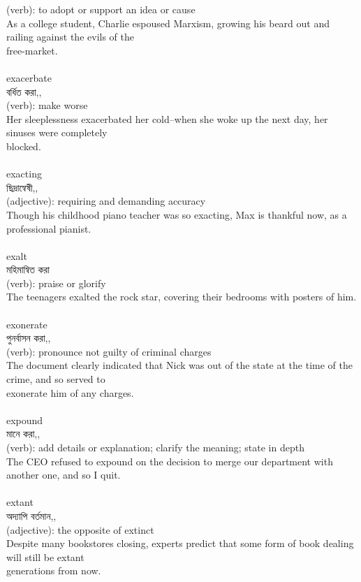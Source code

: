 \documentclass{article}
\begin{document}
{(verb): to adopt or support an idea or cause\\As a college student, Charlie espoused Marxism, growing his beard out and railing against the evils of the\\free-market.\\}\\
{exacerbate}\\
{বর্ধিত করা,,}\\
{(verb): make worse\\Her sleeplessness exacerbated her cold--when she woke up the next day, her sinuses were completely\\blocked.\\}\\
{exacting}\\
{ছিদ্রান্বেষী,,}\\
{(adjective): requiring and demanding accuracy\\Though his childhood piano teacher was so exacting, Max is thankful now, as a professional pianist.\\}\\
{exalt}\\
{মহিমান্বিত করা}\\
{(verb): praise or glorify\\The teenagers exalted the rock star, covering their bedrooms with posters of him.\\}\\
{exonerate}\\
{পুনর্বাসন করা,,}\\
{(verb): pronounce not guilty of criminal charges\\The document clearly indicated that Nick was out of the state at the time of the crime, and so served to\\exonerate him of any charges.\\}\\
{expound}\\
{মানে করা,,}\\
{(verb): add details or explanation; clarify the meaning; state in depth\\The CEO refused to expound on the decision to merge our department with another one, and so I quit.\\}\\
{extant}\\
{অদ্যাপি বর্তমান,,}\\
{(adjective): the opposite of extinct\\Despite many bookstores closing, experts predict that some form of book dealing will still be extant\\generations from now.\\}\\
\end{document}

